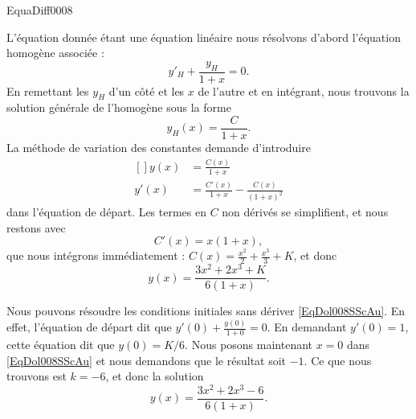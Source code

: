 \begin{corrige}{EquaDiff0008}

L'équation donnée étant une équation linéaire nous résolvons d'abord l'équation homogène associée :
\begin{equation}
	y'_H+\frac{ y_H }{ 1+x }=0.
\end{equation}
En remettant les $y_H$ d'un côté et les $x$ de l'autre et en intégrant, nous trouvons la solution générale de l'homogène sous la forme
\begin{equation}
	y_H(x)=\frac{ C }{ 1+x }.
\end{equation}
La méthode de variation des constantes demande d'introduire
\begin{equation}
	\begin{aligned}[]
		y(x)&=\frac{ C(x) }{ 1+x }\\
		y'(x)&=\frac{ C'(x) }{ 1+x }-\frac{ C(x) }{ (1+x)^2 }
	\end{aligned}
\end{equation}
dans l'équation de départ. Les termes en $C$ non dérivés se simplifient, et nous restons avec
\begin{equation}
	C'(x)=x(1+x),
\end{equation}
que nous intégrons immédiatement : $C(x)=\frac{ x^2 }{ 2 }+\frac{ x^3 }{ 3 }+K$, et donc
\begin{equation}		\label{EqDol008SScAu}
	y(x)=\frac{ 3x^2+2x^3+K }{ 6(1+x) }.
\end{equation}

Nous pouvons résoudre les conditions initiales sans dériver \eqref{EqDol008SScAu}. En effet, l'équation de départ dit que $y'(0)+\frac{ y(0) }{ 1+0 }=0$. En demandant $y'(0)=1$, cette équation dit que $y(0)=K/6$. Nous posons maintenant $x=0$ dans \eqref{EqDol008SScAu} et nous demandons que le résultat soit $-1$. Ce que nous trouvons est $k=-6$, et donc la solution
\begin{equation}
	y(x)=\frac{ 3x^2+2x^3-6 }{ 6(1+x) }.
\end{equation}
\end{corrige}
